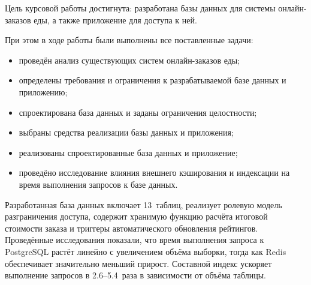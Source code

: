 
Цель курсовой работы достигнута: разработана базы данных для системы онлайн-заказов еды, а также приложение для доступа к ней.

При этом в ходе работы были выполнены все поставленные задачи:
\begin{itemize}
    \item проведён анализ существующих систем онлайн-заказов еды;
    \item определены требования и ограничения к разрабатываемой базе данных и приложению;
    \item спроектирована база данных и заданы ограничения целостности;
    \item выбраны средства реализации базы данных и приложения;
    \item реализованы спроектированные база данных и приложение;
    \item проведёно исследование влияния внешнего кэширования и индексации на время выполнения запросов к базе данных.
\end{itemize}

Разработанная база данных включает 13~таблиц, реализует ролевую модель разграничения доступа, содержит хранимую функцию расчёта итоговой стоимости заказа и триггеры автоматического обновления рейтингов. Проведённые исследования показали, что время выполнения запроса к PostgreSQL растёт линейно с увеличением объёма выборки, тогда как Redis обеспечивает значительно меньший прирост. Составной индекс ускоряет выполнение запросов в 2.6--5.4~раза в зависимости
от объёма таблицы.